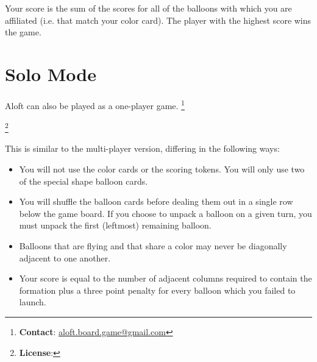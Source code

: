 \documentclass[a6paper, 11pt, parskip=half, DIV=15]{scrartcl}
\newcommand\blfootnote[1]{%
  \begingroup
  \renewcommand\thefootnote{}\footnote{#1}%
  \addtocounter{footnote}{-1}%
  \endgroup
}
\renewcommand{\thefootnote}{\fnsymbol{footnote}}
\begin{document}

Your score is the sum of the scores for all of the balloons with which you are affiliated (i.e. that match your color card). The player with the highest score wins the game.

\newpage
\enlargethispage{1.75\baselineskip}
\section*{Solo Mode}
Aloft can also be played as a one-player game.
\blfootnote{\textbf{Contact}: \href{mailto:aloft.board.game@gmail.com}{aloft.board.game@gmail.com}}
\blfootnote{\textbf{License}: \raggedright\doclicenseLongText}
This is similar to the multi-player version, differing in the following ways:
\begin{itemize}
  \item You will not use the color cards or the scoring tokens. You will only use two of the special shape balloon cards.
  \item You will shuffle the balloon cards before dealing them out in a single row below the game board. If you choose to unpack a balloon on a given turn, you must unpack the first (leftmost) remaining balloon.
  \item Balloons that are flying and that share a color may never be diagonally adjacent to one another.
  \item Your score is equal to the number of adjacent columns required to contain the formation plus a three point penalty for every balloon which you failed to launch.
\end{itemize}
\end{document}
